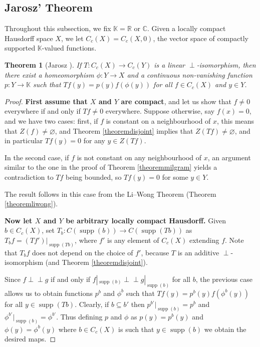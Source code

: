 \documentclass[letter,11pt]{amsart}
\theoremstyle{plain}		\newtheorem{theorem}[generalnumbering]{Theorem}
\theoremstyle{plain}		\newtheorem{corollary}[generalnumbering]{Corollary}
\theoremstyle{definition}		\newtheorem{definition}[generalnumbering]{Definition}
\theoremstyle{definition}		\newtheorem{example}[generalnumbering]{Example}
\theoremstyle{plain}		\newtheorem{proposition}[generalnumbering]{Proposition}
\theoremstyle{plain}		\newtheorem{lemma}[generalnumbering]{Lemma}
\theoremstyle{definition}
\newcommand{\perpp}{\perp\!\!\!\perp}
\DeclareMathOperator{\supp}{supp}
\begin{document}

\subsection{Jarosz' Theorem}\label{subsectionjarosz}

Throughout this subsection, we fix $\mathbb{K}=\mathbb{R}$ or $\mathbb{C}$. Given a locally compact Hausdorff space $X$, we let $C_c(X)=C_c(X,0)$, the vector space of compactly supported $\mathbb{K}$-valued functions.

\begin{theorem}[Jarosz \cite{MR1060366}]\label{theoremjarosz}
	If $T\colon C_c(X)\to C_c(Y)$ is a linear $\perp$-isomorphism, then there exist a homeomorphism $\phi\colon Y\to X$ and a continuous non-vanishing function $p\colon Y\to\mathbb{K}$ such that $Tf(y)=p(y)f(\phi(y))$ for all $f\in C_c(X)$ and $y\in Y$.
\end{theorem}
\begin{proof}
	\textbf{First assume that $X$ and $Y$ are compact}, and let us show that $f\neq 0$ everywhere if and only if $Tf\neq 0$ everywhere. Suppose otherwise, say $f(x)=0$, and we have two cases: first, if $f$ is constant on a neighbourhood of $x$, this means that $Z(f)\neq \varnothing$, and Theorem \ref{theoremdisjoint} implies that $Z(Tf)\neq \varnothing$, and in particular $Tf(y)=0$ for any $y\in Z(Tf)$.
	
	In the second case, if $f$ is not constant on any neighbourhood of $x$, an argument similar to the one in the proof of Theorem \ref{theoremmilgram} yields a contradiction to $Tf$ being bounded, so $Tf(y)=0$ for some $y\in Y$.
	
	The result follows in this case from the Li--Wong Theorem (Theorem \ref{theoremliwong}).
	
	\textbf{Now let $X$ and $Y$ be arbitrary locally compact Hausdorff.} Given $b\in C_c(X)$, set $T_b\colon C(\supp(b))\to C(\supp(Tb))$ as $T_bf=(Tf')|_{\supp(Tb)}$, where $f'$ is any element of $C_c(X)$ extending $f$. Note that $T_bf$ does not depend on the choice of $f'$, because $T$ is an additive $\perp$-isomorphism (and Theorem \ref{theoremdisjoint}).
	
	Since $f\perpp g$ if and only if $f|_{\supp(b)}\perpp g|_{\supp(b)}$ for all $b$, the previous case allows us to obtain functions $p^b$ and $\phi^b$ such that $Tf(y)=p^b(y)f(\phi^b(y))$ for all $y\in\supp(Tb)$. Clearly, if $b\subseteq b'$ then $p^{b'}|_{\supp(b)}=p^b$ and $\phi^{b'}|_{\supp(b)}=\phi^{b'}$. Thus defining $p$ and $\phi$ as $p(y)=p^b(y)$ and $\phi(y)=\phi^b(y)$ where $b\in C_c(X)$ is such that $y\in\supp(b)$ we obtain the desired maps.\qedhere
\end{proof}
\end{document}
